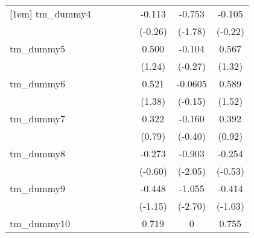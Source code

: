 {\begin{tabular}{l*{7}{c}}
[1em]
tm\_dummy4   &                     &                     &                     &                     &      -0.113         &      -0.753         &      -0.105         \\
            &                     &                     &                     &                     &     (-0.26)         &     (-1.78)         &     (-0.22)         \\
[1em]
tm\_dummy5   &                     &                     &                     &                     &       0.500         &      -0.104         &       0.567         \\
            &                     &                     &                     &                     &      (1.24)         &     (-0.27)         &      (1.32)         \\
[1em]
tm\_dummy6   &                     &                     &                     &                     &       0.521         &     -0.0605         &       0.589         \\
            &                     &                     &                     &                     &      (1.38)         &     (-0.15)         &      (1.52)         \\
[1em]
tm\_dummy7   &                     &                     &                     &                     &       0.322         &      -0.160         &       0.392         \\
            &                     &                     &                     &                     &      (0.79)         &     (-0.40)         &      (0.92)         \\
[1em]
tm\_dummy8   &                     &                     &                     &                     &      -0.273         &      -0.903\sym{*}  &      -0.254         \\
            &                     &                     &                     &                     &     (-0.60)         &     (-2.05)         &     (-0.53)         \\
[1em]
tm\_dummy9   &                     &                     &                     &                     &      -0.448         &      -1.055\sym{**} &      -0.414         \\
            &                     &                     &                     &                     &     (-1.15)         &     (-2.70)         &     (-1.03)         \\
[1em]
tm\_dummy10  &                     &                     &                     &                     &       0.719         &           0         &       0.755         \\

\end{tabular}}
